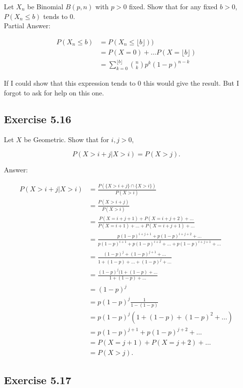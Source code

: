 \documentclass{article}
\begin{document}
Let $X_n$ be Binomial $B(p, n)$ with $p > 0$ fixed. Show that for any fixed $b > 0$, $P(X_n \leq b)$ tends to 0.\\

Partial Answer: 

\begin{align*}
P(X_n \leq b) &= P(X_n \leq \lfloor b \rfloor)) \\
&= P(X = 0) + \dots P(X = \lfloor b \rfloor) \\
&= \sum_{k=0}^{\lfloor b \rfloor} \binom{n}{k} p^k (1-p)^{n-k}
\end{align*}

If I could show that this expression tends to 0 this would give the result. But I forgot to ask for help on this one. 


\subsection*{Exercise 5.16}

Let $X$ be Geometric. Show that for $i,j > 0$,

$$
P(X > i+j \vert  X > i) = P(X > j).
$$

Answer:

\begin{align*}
P(X > i+j \vert  X > i)
&= \frac{P(\{X > i+j\} \cap \{X > i\})}{P(X > i)} \\
&= \frac{P(X > i+j)}{P(X > i)} \\
&= \frac{P(X = i+j+1) + P(X = i+j + 2) + \dots }{P(X = i+1) + \dots +P(X = i+j+1) + \dots} \\
&= \frac{p(1-p)^{i+j+1} + p(1-p)^{i+j+2} + \dots }{p(1-p)^{i+1} + p(1-p)^{i+2} + \dots + p(1-p)^{i+j+1} + \dots}\\
&= \frac{(1-p)^j + (1-p)^{j+1} + \dots}{1 + (1-p) + \dots +(1-p)^j + \dots } \\
&= \frac{(1-p)^j(1 + (1-p) + \dots }{1 + (1-p) + \dots } \\
&= (1-p)^j \\
&= p(1-p)^j \frac{1}{1-(1-p)} \\
&= p(1-p)^j(1 + (1-p) + (1-p)^2 + \dots ) \\
&= p(1-p)^{j+1} + p(1-p)^{j+2} + \dots \\
&= P(X = j+1) + P(X = j+2) + \dots \\
&= P(X > j).
\end{align*}

\subsection*{Exercise 5.17}
\end{document}
